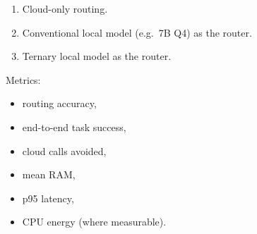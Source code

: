 \begin{enumerate}
  \item Cloud-only routing.
  \item Conventional local model (e.g.\ 7B Q4) as the router.
  \item Ternary local model as the router.
\end{enumerate}

Metrics:
\begin{itemize}
  \item routing accuracy,
  \item end-to-end task success,
  \item cloud calls avoided,
  \item mean RAM,
  \item p95 latency,
  \item CPU energy (where measurable).
\end{itemize}
